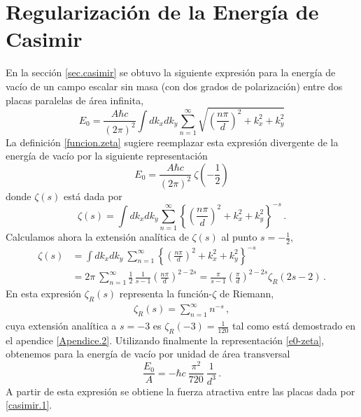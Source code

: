 \section{Regularización de la Energía de Casimir}\label{cap.casimir}

En la sección \ref{sec.casimir} se obtuvo la siguiente expresión para la energía de vacío de un campo escalar sin masa (con dos grados de polarización) entre dos placas paralelas de área infinita,
\begin{equation}
E _0 = \frac{A \hbar c}{(2 \pi) ^2} \int dk _x dk _y 
\sum _{n=1} ^{\infty} 
\sqrt{
		\left( \frac{n \pi}{d} \right) ^2 + k _x ^2 + k _y ^2
		}
\end{equation}
La definición \eqref{funcion.zeta} sugiere reemplazar esta expresión divergente de la energía de vacío por la siguiente representación
\begin{equation}\label{e0-zeta}
E _0 = \frac{A \hbar c}{(2 \pi) ^2} 
\ \zeta \left( - \frac{1}{2} \right)
\end{equation}
donde $\zeta (s)$ está dada por
\begin{equation}
\zeta(s) = \int dk _x dk _y 
\sum _{n=1} ^{\infty} 
\left\{\left( \frac{n \pi}{d} \right) ^2 + k _x ^2 + k _y ^2\right\}^{-s}\,.
\end{equation}
Calculamos ahora la extensión analítica de $\zeta(s)$ al punto $s=-\frac12$,
\begin{align}
\zeta (s) &= 
\int dk _x dk _y 
\ \sum _{n=1} ^{\infty} 
\left\{	\left( \frac{n \pi}{d} \right) ^2 + k _x ^2 + k _y ^2
		\right\}^{-s} \nonumber\\[2mm]
&=2\pi\ \sum _{n=1} ^{\infty}  \frac12\,\frac{1}{s-1} \left( \frac{n \pi}{d} \right) ^{2-2s} =
\frac{\pi}{s-1} \left( \frac{\pi}{d} \right) ^{2-2s} \zeta_R (2s-2)\,.
\end{align}
En esta expresión $\zeta_R(s)$ representa la función-$\zeta$ de Riemann,
\begin{align}\label{rieman-zeta-def}
	\zeta_R(s)=\sum_{n=1}^\infty n^{-s}\,,
\end{align}
cuya extensión analítica a $s=-3$ es $\zeta_R(-3)=\frac{1}{120}$ tal como está demostrado en el apendice \ref{Apendice.2}. Utilizando finalmente la representación \eqref{e0-zeta}, obtenemos para la energía de vacío por unidad de área transversal
\begin{equation}
\frac{E _0}{A} = 
- \hbar c\ \frac{ \pi ^2}{720}\ \frac{1}{d^3}\,.
\end{equation}
A partir de esta expresión se obtiene la fuerza atractiva entre las placas dada por \eqref{casimir.1}.

